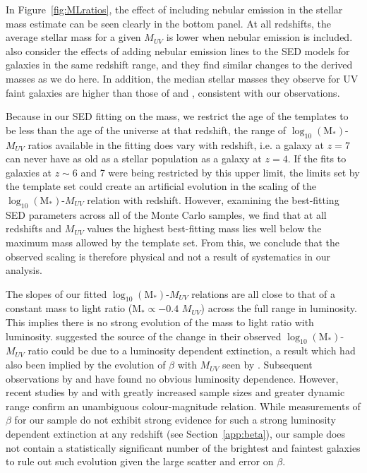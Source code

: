 In Figure~\ref{fig:MLratios}, the effect of including nebular emission in the stellar mass estimate can be seen clearly in the bottom panel. At all redshifts, the average stellar mass for a given $M_{UV}$ is lower when nebular emission is included. \citet{Salmon:2014tm} also consider the effects of adding nebular emission lines to the SED models for galaxies in the same redshift range, and they find similar changes to the derived masses as we do here. In addition, the median stellar masses they observe for UV faint galaxies are higher than those of \citet{Gonzalez:2011dn} and \citet{2012ApJ...752...66L}, consistent with our observations.

Because in our SED fitting on the mass, we restrict the age of the templates to be less than the age of the universe at that redshift, the range of $\log_{10} (\text{M}_{*})$-$M_{UV}$ ratios available in the fitting does vary with redshift, i.e. a galaxy at $z = 7$ can never have as old as a stellar population as a galaxy at $z = 4$. If the fits to galaxies at $z \sim 6$ and 7 were being restricted by this upper limit, the limits set by the template set could create an artificial evolution in the scaling of the $\log_{10} (\text{M}_{*})$-$M_{UV}$ relation with redshift. However, examining the best-fitting SED parameters across all of the Monte Carlo samples, we find that at all redshifts and $M_{UV}$ values the highest best-fitting mass lies well below the maximum mass allowed by the template set. From this, we conclude that the observed scaling is therefore physical and not a result of systematics in our analysis. 

The slopes of our fitted $\log_{10} (\text{M}_{*})$-$M_{UV}$ relations are all close to that of a constant mass to light ratio (M$_{*} \propto -0.4$ $M_{UV}$) across the full range in luminosity. This implies there is no strong evolution of the mass to light ratio with luminosity. \citet{2012ApJ...752...66L} suggested the source of the change in their observed $\log_{10} (\text{M}_{*})$-$M_{UV}$ ratio could be due to a luminosity dependent extinction, a result which had also been implied by the evolution of $\beta$ with $M_{UV}$ seen by \citet{2012ApJ...754...83B}. Subsequent observations by \citet{Dunlop:2011jl} and \citet{2012ApJ...756..164F} have found no obvious luminosity dependence. However, recent studies by \citet{Bouwens:2013vf} and \citep{Rogers:2014bn} with greatly increased sample sizes and greater dynamic range confirm an unambiguous colour-magnitude relation. While measurements of $\beta$ for our sample do not exhibit strong evidence for such a strong luminosity dependent extinction at any redshift (see Section~\ref{app:beta}), our sample does not contain a statistically significant number of the brightest and faintest galaxies to rule out such evolution given the large scatter and error on $\beta$. 

